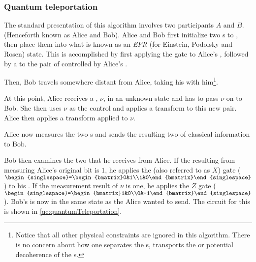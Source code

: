 \subsubsection{Quantum teleportation} %
\label{ssub:quantum_teleportation}

The standard presentation of this algorithm involves two participants $A$ and $B$. (Henceforth
known as Alice and Bob). Alice and Bob first initialize two \qubit{}s to , then place them
into what is known as an \emph{EPR} (for Einstein, Podolsky and Rosen) state. This is accomplished
by first applying the \Had{} gate to Alice's \qubit{}, followed by a \Cnot{} to the pair of
\qubits{} controlled by Alice's \qubit{}.

Then, Bob travels somewhere distant from Alice, taking his \qubit{} with him\footnote{Notice that
all other physical constraints are ignored in this algorithm. There is no concern about how one
separates the \qubit{}s, transports the \qubit{} or potential decoherence of the \qubit{}s.}.

At this point, Alice receives a \qubit{}, $\nu$, in an unknown state and has to pass $\nu$ on to
Bob. She then uses $\nu$ as the control and applies a {\Cnot{}} transform to this new pair. Alice
then applies a \Had{} transform applied to $\nu$.

Alice now measures the two \qubit{}s and sends the resulting two \bits{} of classical information
to Bob.

Bob then examines the two \bits{} that he receives from Alice. If the \bit{} resulting from
measuring Alice's original bit is $1$, he applies the \nottr{} (also referred to as $X$) gate
($\begin{singlespace}=\begin{bmatrix}0&1\\1&0\end{bmatrix}\end{singlespace}$) to his \qubit{}. If
the measurement result of $\nu$ is one, he applies the $Z$ gate
($\begin{singlespace}=\begin{bmatrix}1&0\\0&-1\end{bmatrix}\end{singlespace}$). Bob's \qubit{} is
now in the same state as the \qubit{} Alice wanted to send. The circuit for this is shown in
\vref{qc:quantumTeleportation}.

